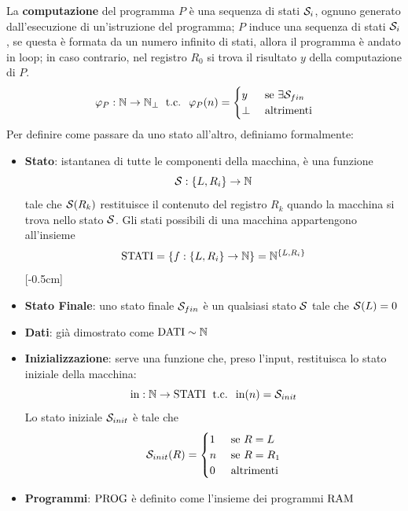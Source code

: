 La \textbf{computazione} del programma $P$ è una sequenza di stati $\mathcal{S}_i$, ognuno generato dall'esecuzione di un'istruzione del programma; $P$ induce una sequenza di stati $\mathcal{S}_i$, se questa è formata da un numero infinito di stati, allora il programma è andato in loop; in caso contrario, nel registro $R_0$ si trova il risultato $y$ della computazione di $P$.
$$ 
\varphi_P: \mathbb{N} \rightarrow \mathbb{N}_\bot \; \text{ t.c. } \; \varphi_P(n) = \begin{cases}
	y & \text{ se } \exists \mathcal{S}_{fin} \\
	\bot & \text{ altrimenti}
\end{cases}
$$
Per definire come passare da uno stato all'altro, definiamo formalmente: 
\begin{itemize}
	\item \textbf{Stato}: istantanea di tutte le componenti della macchina, è una funzione 
	$$ \mathcal{S}: \{L, R_i\} \rightarrow \mathbb{N} $$
	tale che $\mathcal{S} (R_k)$ restituisce il contenuto del registro $R_k$ quando la macchina si trova nello stato $\mathcal{S}$. Gli stati possibili di una macchina appartengono all'insieme 
		$$ \text{STATI} = \{f: \{L, R_i\} \rightarrow \mathbb{N}\} = \mathbb{N}^{\{L,R_i\}} $$
		[-0.5cm]

	\vspace{-0.5cm}
	
	\item \textbf{Stato Finale}: uno stato finale $\mathcal{S}_{fin}$ è un qualsiasi stato $\mathcal{S}$ tale che $\mathcal{S} (L) = 0$
	\item \textbf{Dati}: già dimostrato come $\text{DATI} \sim \mathbb{N}$
	\item \textbf{Inizializzazione}: serve una funzione che, preso l'input, restituisca lo stato iniziale della macchina: 
	$$ \text{in}: \mathbb{N} \rightarrow \text{STATI} \; \text{ t.c. } \; \text{in}(n) = \mathcal{S}_{init}$$
	Lo stato iniziale $\mathcal{S}_{init}$ è tale che
	$$ 
	\mathcal{S}_{init} (R) = \begin{cases}
		1 & \text{ se } R=L \\
		n & \text{ se } R=R_1 \\
		0 & \text{ altrimenti}
	\end{cases}
	$$
	\item \textbf{Programmi}: $\text{PROG}$ è definito come l'insieme dei programmi $\text{RAM}$
\end{itemize}

